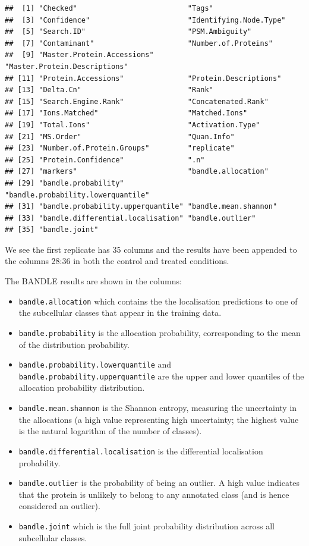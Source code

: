 \documentclass[9pt,a4paper,]{extarticle}
\begin{document}
\begin{verbatim}
##  [1] "Checked"                          "Tags"                            
##  [3] "Confidence"                       "Identifying.Node.Type"           
##  [5] "Search.ID"                        "PSM.Ambiguity"                   
##  [7] "Contaminant"                      "Number.of.Proteins"              
##  [9] "Master.Protein.Accessions"        "Master.Protein.Descriptions"     
## [11] "Protein.Accessions"               "Protein.Descriptions"            
## [13] "Delta.Cn"                         "Rank"                            
## [15] "Search.Engine.Rank"               "Concatenated.Rank"               
## [17] "Ions.Matched"                     "Matched.Ions"                    
## [19] "Total.Ions"                       "Activation.Type"                 
## [21] "MS.Order"                         "Quan.Info"                       
## [23] "Number.of.Protein.Groups"         "replicate"                       
## [25] "Protein.Confidence"               ".n"                              
## [27] "markers"                          "bandle.allocation"               
## [29] "bandle.probability"               "bandle.probability.lowerquantile"
## [31] "bandle.probability.upperquantile" "bandle.mean.shannon"             
## [33] "bandle.differential.localisation" "bandle.outlier"                  
## [35] "bandle.joint"
\end{verbatim}

We see the first replicate has 35 columns and the results have been appended
to the columns 28:36 in both the control and treated conditions.

The BANDLE results are shown in the columns:

\begin{itemize}
\item
  \texttt{bandle.allocation} which contains the the localisation predictions to one of
  the subcellular classes that appear in the training data.
\item
  \texttt{bandle.probability} is the allocation probability, corresponding to the mean of
  the distribution probability.
\item
  \texttt{bandle.probability.lowerquantile} and \texttt{bandle.probability.upperquantile} are the
  upper and lower quantiles of the allocation probability distribution.
\item
  \texttt{bandle.mean.shannon} is the Shannon entropy, measuring the uncertainty in the
  allocations (a high value representing high uncertainty; the highest value is
  the natural logarithm of the number of classes).
\item
  \texttt{bandle.differential.localisation} is the differential localisation probability.
\item
  \texttt{bandle.outlier} is the probability of being an outlier. A high value indicates
  that the protein is unlikely to belong to any annotated class (and is hence considered an outlier).
\item
  \texttt{bandle.joint} which is the full joint probability distribution across all
  subcellular classes.
\end{itemize}
\end{document}
